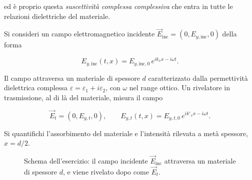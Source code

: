 ed è proprio questa \emph{suscettività complessa complessiva} che entra in tutte le relazioni dielettriche del materiale.

\begin{exercise}
Si consideri un campo elettromagnetico incidente \( \vec{E}_{\text{inc}} = (0, E_{y,\text{inc}}, 0) \) della forma

\begin{equation}
    E_{y,\text{inc}}(t, x) = E_{y,\text{inc},0} \, e^{i k_x x - i \omega t}.
\end{equation}

Il campo attraversa un materiale di spessore \( d \) caratterizzato dalla permettività dielettrica complessa \( \varepsilon = \varepsilon_1 + i \varepsilon_2 \), con \( \omega \) nel range ottico. Un rivelatore in trasmissione, al di là del materiale, misura il campo

\begin{equation}
    \vec{E}_t = (0, E_{y,t}, 0), \qquad E_{y,t}(t, x) = E_{y,t,0} \, e^{i k'_x x - i \omega t}.
\end{equation}

Si quantifichi l'assorbimento del materiale e l'intensità rilevata a metà spessore, \( x = d/2 \).

\begin{figure}[htbp]
    \centering
    \caption{Schema dell'esercizio: il campo incidente \( \vec{E}_{\text{inc}} \) attraversa un materiale di spessore \( d \), e viene rivelato dopo come \( \vec{E}_t \).}
    \label{fig:esercizio_assorbimento}
\end{figure}
\end{exercise}

